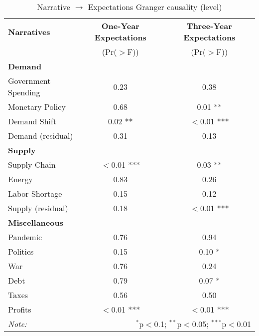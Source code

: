 \begin{table}[ht]
\centering
\caption{Narrative $\rightarrow$ Expectations Granger causality (level)}\label{tab:granger_level}

\begin{tabular}{lcc}
\toprule
\textbf{Narratives} & \textbf{One-Year Expectations} & \textbf{Three-Year Expectations} \\
& (Pr($>$F)) & (Pr($>$F)) \\
\midrule
\multicolumn{3}{l}{\textbf{Demand}} \\
\midrule
Government Spending & 0.23 & 0.38 \\
Monetary Policy & 0.68 & 0.01 ** \\
Demand Shift & 0.02 ** & $<$0.01 *** \\
Demand (residual) & 0.31 & 0.13 \\
\midrule
\multicolumn{3}{l}{\textbf{Supply}} \\
\midrule
Supply Chain & $<$0.01 *** & 0.03 ** \\
Energy & 0.83 & 0.26 \\
Labor Shortage & 0.15 & 0.12 \\
Supply (residual) & 0.18 & $<$0.01 *** \\
\midrule
\multicolumn{3}{l}{\textbf{Miscellaneous}} \\
\midrule
Pandemic & 0.76 & 0.94 \\
Politics & 0.15 & 0.10 * \\
War & 0.76 & 0.24 \\
Debt & 0.79 & 0.07 * \\
Taxes & 0.56 & 0.50 \\
Profits & $<$0.01 *** & $<$0.01 *** \\
\midrule
\bottomrule
\textit{Note:}  & \multicolumn{2}{r}{$^{*}$p$<$0.1; $^{**}$p$<$0.05; $^{***}$p$<$0.01} \\
\bottomrule
\end{tabular}
\end{table}
